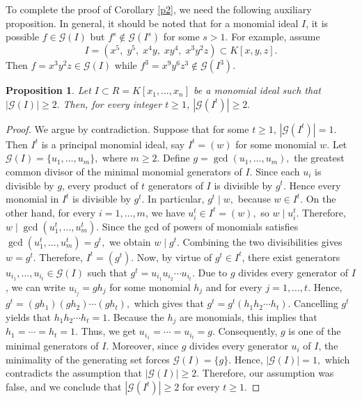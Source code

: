 \documentclass[11pt]{amsart}
\newtheorem{proposition}[theorem]{Proposition}
\begin{document}


\bigskip
To complete the proof of Corollary  \ref{p2}, we need the following auxiliary proposition. In general, it should be noted that for a 
monomial ideal $I$, it  is possible  $f \in \mathcal{G}(I)$ but $f^s \notin \mathcal{G}(I^s)$ for some $s>1$. For example, assume 
\[
I=(x^5,\; y^5,\; x^4y,\; xy^4,\; x^3y^2z)\subset K[x,y,z].
\]
Then  $f=x^3y^2z \in \mathcal{G}(I)$ while  $f^3=x^9y^6z^3 \notin \mathcal{G}(I^3).$

\begin{proposition} \label{min.gens}
Let $I\subset R=K[x_1, \ldots, x_n]$ be a monomial ideal such that $|\mathcal{G}(I)|\geq 2.$ Then, for every integer $t\geq 1$,
$|\mathcal{G}(I^t)|\geq 2.$
\end{proposition}

\begin{proof}
We argue by contradiction. Suppose that for some $t\geq 1$,  $|\mathcal{G}(I^t)|=1.$ 
 Then $I^t$ is a principal monomial ideal, say $I^t=(w)$ for some monomial $w$.
  Let $\mathcal{G}(I)=\{u_1,\ldots,u_m\},$ where $m\geq 2$. Define $g=\gcd(u_1,\ldots,u_m),$ 
the greatest common divisor of the minimal monomial generators of $I$. 
Since each $u_i$ is divisible by $g$, every product of $t$ generators of $I$ is divisible by $g^t$. Hence every monomial in $I^t$ is divisible by $g^t$. In particular,  $g^t\mid w,$ because $w\in I^t$. On the other hand, for every $i=1,\ldots,m$, we have $u_i^t\in I^t=(w),$ so $w\mid u_i^t .$ 
Therefore, $w\mid \gcd(u_1^t,\ldots,u_m^t).$ Since the gcd of powers of monomials satisfies
 $\gcd(u_1^t,\ldots,u_m^t)=g^t,$ we obtain $w\mid g^t.$  Combining the two divisibilities gives
 $w=g^t.$  Therefore, $I^t=(g^t).$  Now, by virtue of  $g^t\in I^t$, there exist generators $u_{i_1},\ldots,u_{i_t}\in\mathcal{G}(I)$ 
 such that $g^t=u_{i_1}u_{i_2}\cdots u_{i_t}.$ Due to  $g$ divides every generator of $I$, we can write
 $u_{i_j}=gh_j$ for some monomial $h_j$ and for every $j=1,\ldots,t$. Hence, $g^t=(gh_1)(gh_2)\cdots(gh_t),$ which gives that 
 $g^t=g^t(h_1h_2\cdots h_t).$ Cancelling $g^t$ yields that $h_1h_2\cdots h_t=1.$ Because the $h_j$ are monomials, this implies that 
 $h_1=\cdots=h_t=1.$ Thus,  we get $u_{i_1}=\cdots=u_{i_t}=g.$ Consequently,  $g$ is one of the minimal generators of $I$. Moreover, since $g$ divides every generator $u_i$ of $I$, the minimality of the generating set forces $\mathcal{G}(I)=\{g\}.$ Hence, $|\mathcal{G}(I)|=1,$
 which contradicts the assumption that $|\mathcal{G}(I)|\geq2.$ Therefore, our assumption was false, and we conclude that
 $|\mathcal{G}(I^t)|\geq2$ for every $t\geq1$.
\end{proof}
\end{document}
